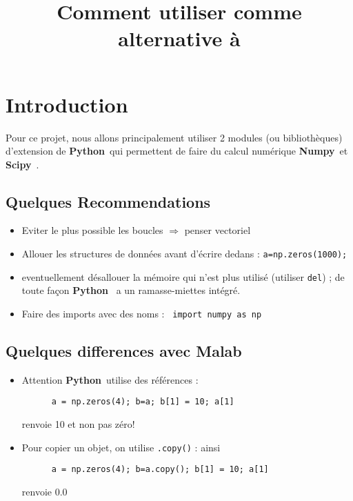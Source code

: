 \documentclass[11pt,a4wide]{article}
\title{Comment utiliser \python comme alternative à \matlab}
\newcommand{\matlab}{{\ECFTeenSpirit Malab}\ }
\newcommand{\python}{{\bf Python}\ }
\newcommand{\numpy}{{\bf Numpy}\ }
\newcommand{\scipy}{{\bf Scipy}\ }
\begin{document}
\maketitle
\section{Introduction}
  Pour ce projet, nous allons principalement utiliser 2 modules (ou bibliothèques) d'extension de \python qui
  permettent de faire du calcul numérique \numpy et \scipy.

  \subsection{Quelques Recommendations}
 
    \begin{itemize}

      \item Eviter le plus possible les boucles $\Rightarrow$ penser vectoriel
      \item Allouer les structures de données avant d'écrire dedans : \lstinline!a=np.zeros(1000);!
      \item eventuellement désallouer la mémoire qui n'est plus utilisé (utiliser {\tt del}) ; de toute façon \python 
      a un ramasse-miettes intégré.
      \item Faire des imports avec des noms : \lstinline! import numpy as np!
       
    \end{itemize}

  \subsection{Quelques differences avec \matlab}
    \begin{itemize}
      
      \item Attention \python utilise des références : 
      \begin{lstlisting} 
      a = np.zeros(4); b=a; b[1] = 10; a[1]
      \end{lstlisting}
      renvoie 10 et non pas zéro!
      \item Pour copier un objet, on utilise {\tt .copy()} : ainsi 
      \begin{lstlisting} 
      a = np.zeros(4); b=a.copy(); b[1] = 10; a[1]
      \end{lstlisting}
      renvoie 0.0 
    \end{itemize}
\end{document}
